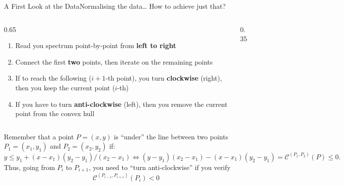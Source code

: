 \begin{frame}[fragile]{A First Look at the Data}{Normalising the data\dots}
    How to achieve just that?

    \vfill \pause

    \begin{columns}[c]
        \begin{column}{0.65\textwidth}
            \begin{enumerate}[<+->]
                \item Read you spectrum point-by-point from \textbf{left to right}
                \item Connect the first \textbf{two} points, then iterate on the remaining points
                \item If to reach the following ($i+1$-th point), you turn \textbf{clockwise} (right), then you keep the current point ($i$-th)
                \item If you have to turn \textbf{anti-clockwise} (left), then you remove the current point from the convex hull
            \end{enumerate}
        \end{column}
        \hfil
        \begin{column}{0.35\textwidth}
            \centering
            
        \end{column}
    \end{columns}

    \vfill \pause

    {\tiny
        Remember that a point $P = (x, y)$ is \enquote{under} the line between two points $P_1 = (x_1, y_1)$ and $P_2 = (x_2, y_2)$ if:
        \begin{equation*}
            y \le y_1 + (x - x_1) (y_2 - y_1) / (x_2 - x_1)
            \Leftrightarrow
            (y - y_1)(x_2 - x_1) - (x - x_1)(y_2 - y_1) = \mathcal{C}^{(P_1, P_2)}(P) \le 0.
        \end{equation*}
        Thus, going from $P_i$ to $P_{i+1}$, you need to \enquote{turn anti-clockwise} if you verify
        \begin{equation*}
            \mathcal{C}^{(P_{i-1}, P_{i+1})}(P_i) < 0
        \end{equation*}
    }
\end{frame}

